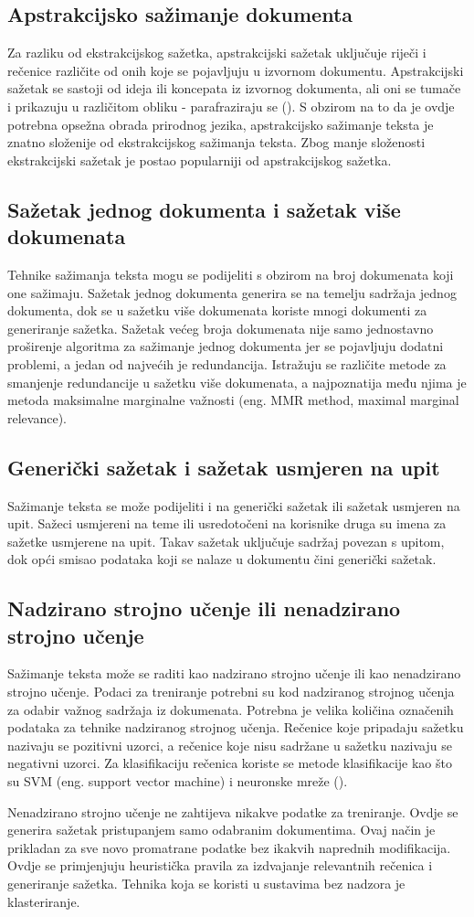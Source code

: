 \documentclass[times, utf8, zavrsni, numeric]{fer}
\begin{document}
\subsection{Apstrakcijsko sažimanje dokumenta}
Za razliku od ekstrakcijskog sažetka, apstrakcijski sažetak uključuje riječi i rečenice različite od onih koje se pojavljuju u izvornom dokumentu.
Apstrakcijski sažetak se sastoji od ideja ili koncepata iz izvornog dokumenta, ali oni se tumače i prikazuju u različitom obliku - parafraziraju se (\citet{article1}).
S obzirom na to da je ovdje potrebna opsežna obrada prirodnog jezika, apstrakcijsko sažimanje teksta je znatno složenije od ekstrakcijskog sažimanja teksta.
Zbog manje složenosti ekstrakcijski sažetak je postao popularniji od apstrakcijskog sažetka.
\subsection{Sažetak jednog dokumenta i sažetak više dokumenata}
Tehnike sažimanja teksta mogu se podijeliti s obzirom na broj dokumenata koji one sažimaju.
Sažetak jednog dokumenta generira se na temelju sadržaja jednog dokumenta, dok se u sažetku više dokumenata koriste mnogi dokumenti za generiranje sažetka.
Sažetak većeg broja dokumenata nije samo jednostavno proširenje algoritma za sažimanje jednog dokumenta jer se pojavljuju dodatni problemi, a jedan od najvećih je redundancija.
Istražuju se različite metode za smanjenje redundancije u sažetku više dokumenata, a najpoznatija među njima je metoda maksimalne marginalne važnosti (eng. MMR method, maximal marginal relevance).
\subsection{Generički sažetak i sažetak usmjeren na upit}
Sažimanje teksta se može podijeliti i na generički sažetak ili sažetak usmjeren na upit.
Sažeci usmjereni na teme ili usredotočeni na korisnike druga su imena za sažetke usmjerene na upit.
Takav sažetak uključuje sadržaj povezan s upitom, dok opći smisao podataka koji se nalaze u dokumentu čini generički sažetak.
\subsection{Nadzirano strojno učenje ili nenadzirano strojno učenje}
Sažimanje teksta može se raditi kao nadzirano strojno učenje ili kao nenadzirano strojno učenje.
Podaci za treniranje potrebni su kod nadziranog strojnog učenja za odabir važnog sadržaja iz dokumenata.
Potrebna je velika količina označenih podataka za tehnike nadziranog strojnog učenja.
Rečenice koje pripadaju sažetku nazivaju se pozitivni uzorci, a rečenice koje nisu sadržane u sažetku nazivaju se negativni uzorci.
Za klasifikaciju rečenica koriste se metode klasifikacije kao što su SVM (eng. support vector machine) i neuronske mreže (\citet{article1}).
\par
Nenadzirano strojno učenje ne zahtijeva nikakve podatke za treniranje. Ovdje se generira sažetak pristupanjem samo odabranim dokumentima.
Ovaj način je prikladan za sve novo promatrane podatke bez ikakvih naprednih modifikacija.
Ovdje se primjenjuju heuristička pravila za izdvajanje relevantnih rečenica i generiranje sažetka.
Tehnika koja se koristi u sustavima bez nadzora je klasteriranje.
\end{document}

